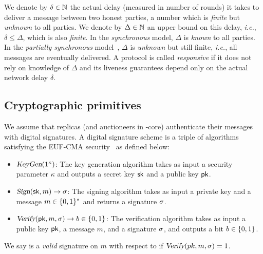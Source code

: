 We denote by $\delta \in \mathbb{N}$ the actual delay (measured in number of rounds) it takes to deliver a message between two honest parties,
a number which is \emph{finite} but \emph{unknown} to all parties.
We denote by $\Delta \in \mathbb{N}$ an upper bound on this delay, \textit{i.e.}, $\delta \leq \Delta$, which is also \emph{finite}.
In the \emph{synchronous} model, $\Delta$ is \emph{known} to all parties.
In the \emph{partially synchronous} model~\cite{psync}, $\Delta$ is \emph{unknown} but still finite, \textit{i.e.}, all messages are eventually delivered.
A protocol is called \emph{responsive} if it does not rely on knowledge of $\Delta$ and its liveness guarantees depend only on the actual network delay $\delta$.

\subsection{Cryptographic primitives}
 We assume that replicas (and auctioneers in \bidsettm-core) authenticate their messages with digital signatures. A digital signature scheme is a triple of algorithms satisfying the EUF-CMA security~\cite{GMR88} as defined below:
		\begin{itemize}
	    	\item $\textsl{KeyGen}(1^{\kappa})$: The key generation algorithm takes as input a security parameter $\kappa$ and outputs a secret key $\textsf{sk}$ and a public key $\textsf{pk}$.
	        \item
	            $\textsl{Sign}(\textsf{sk}, m) \rightarrow \sigma$:
	            The signing algorithm takes as input a private key
	            \sk and a message $m \in \{ 0, 1\}^*$ and returns a signature $\sigma$.
	        \item
	            $\textsl{Verify}(\textsf{pk}, m, \sigma) \rightarrow b \in \{ 0, 1\}$:
	            The verification algorithm takes as input a public
	            key $\textsf{pk}$, a message $m$, and a signature $\sigma$, and outputs a bit $b\in \{ 0, 1\}$.
	    \end{itemize}
We say \sig is a \emph{valid} signature on $m$ with respect to \pk if $\textsl{Verify}(pk, m, \sigma) = 1$.


